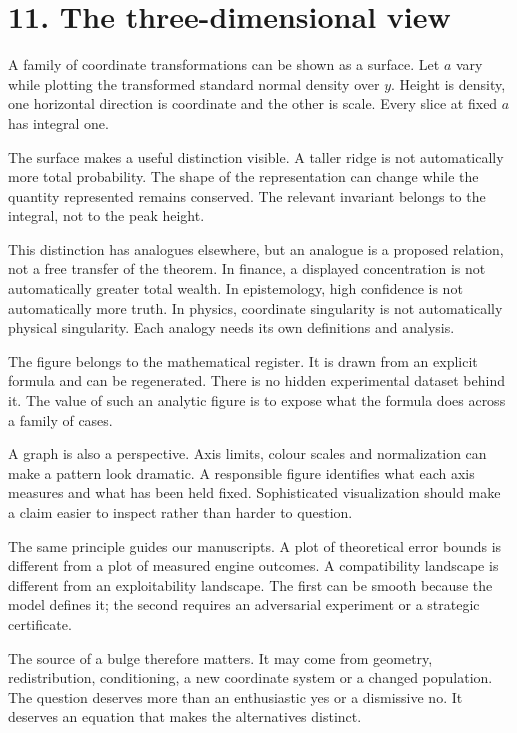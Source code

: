 \documentclass[10pt]{article}
\begin{document}
\clearpage
\section*{11. The three-dimensional view}
A family of coordinate transformations can be shown as a surface. Let $a$ vary while plotting the transformed standard normal density over $y$. Height is density, one horizontal direction is coordinate and the other is scale. Every slice at fixed $a$ has integral one.

The surface makes a useful distinction visible. A taller ridge is not automatically more total probability. The shape of the representation can change while the quantity represented remains conserved. The relevant invariant belongs to the integral, not to the peak height.

This distinction has analogues elsewhere, but an analogue is a proposed relation, not a free transfer of the theorem. In finance, a displayed concentration is not automatically greater total wealth. In epistemology, high confidence is not automatically more truth. In physics, coordinate singularity is not automatically physical singularity. Each analogy needs its own definitions and analysis.

The figure belongs to the mathematical register. It is drawn from an explicit formula and can be regenerated. There is no hidden experimental dataset behind it. The value of such an analytic figure is to expose what the formula does across a family of cases.

A graph is also a perspective. Axis limits, colour scales and normalization can make a pattern look dramatic. A responsible figure identifies what each axis measures and what has been held fixed. Sophisticated visualization should make a claim easier to inspect rather than harder to question.

The same principle guides our manuscripts. A plot of theoretical error bounds is different from a plot of measured engine outcomes. A compatibility landscape is different from an exploitability landscape. The first can be smooth because the model defines it; the second requires an adversarial experiment or a strategic certificate.

The source of a bulge therefore matters. It may come from geometry, redistribution, conditioning, a new coordinate system or a changed population. The question deserves more than an enthusiastic yes or a dismissive no. It deserves an equation that makes the alternatives distinct.
\end{document}
